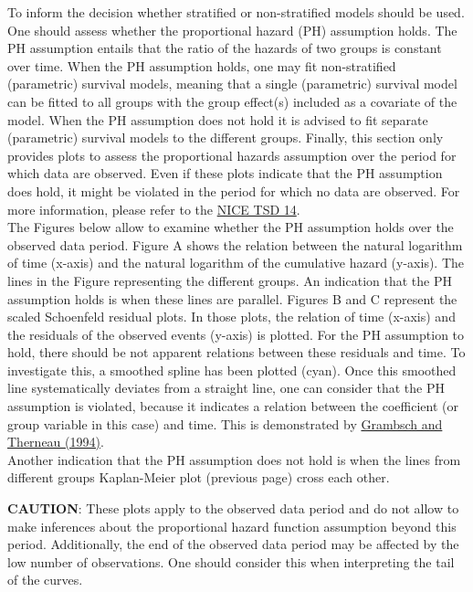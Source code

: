 \documentclass[
]{article}
\begin{document}
To inform the decision whether stratified or non-stratified models
should be used. One should assess whether the proportional hazard (PH)
assumption holds. The PH assumption entails that the ratio of the
hazards of two groups is constant over time. When the PH assumption
holds, one may fit non-stratified (parametric) survival models, meaning
that a single (parametric) survival model can be fitted to all groups
with the group effect(s) included as a covariate of the model. When the
PH assumption does not hold it is advised to fit separate (parametric)
survival models to the different groups. Finally, this section only
provides plots to assess the proportional hazards assumption over the
period for which data are observed. Even if these plots indicate that
the PH assumption does hold, it might be violated in the period for
which no data are observed. For more information, please refer to the
\href{http://nicedsu.org.uk/wp-content/uploads/2016/03/NICE-DSU-TSD-Survival-analysis.updated-March-2013.v2.pdf}{NICE
TSD 14}.\\
The Figures below allow to examine whether the PH assumption holds over
the observed data period. Figure A shows the relation between the
natural logarithm of time (x-axis) and the natural logarithm of the
cumulative hazard (y-axis). The lines in the Figure representing the
different groups. An indication that the PH assumption holds is when
these lines are parallel. Figures B and C represent the scaled
Schoenfeld residual plots. In those plots, the relation of time (x-axis)
and the residuals of the observed events (y-axis) is plotted. For the PH
assumption to hold, there should be not apparent relations between these
residuals and time. To investigate this, a smoothed spline has been
plotted (cyan). Once this smoothed line systematically deviates from a
straight line, one can consider that the PH assumption is violated,
because it indicates a relation between the coefficient (or group
variable in this case) and time. This is demonstrated by
\href{https://doi.org/10.1093/biomet/81.3.515}{Grambsch and Therneau
(1994)}.\\
Another indication that the PH assumption does not hold is when the
lines from different groups Kaplan-Meier plot (previous page) cross each
other.

\textbf{CAUTION}: These plots apply to the observed data period and do
not allow to make inferences about the proportional hazard function
assumption beyond this period. Additionally, the end of the observed
data period may be affected by the low number of observations. One
should consider this when interpreting the tail of the curves.
\end{document}
